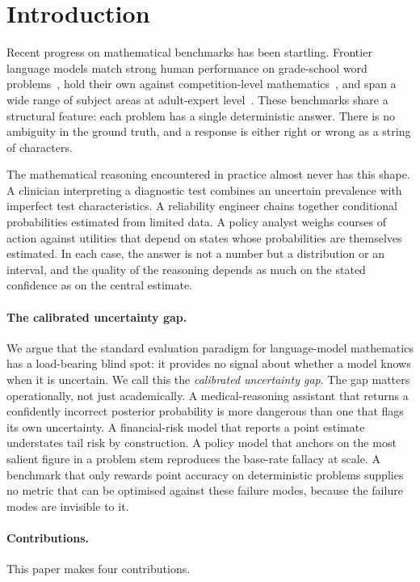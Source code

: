 \documentclass{article}
\begin{document}
\section{Introduction}
\label{sec:introduction}

Recent progress on mathematical benchmarks has been startling. Frontier language models match strong human performance on grade-school word problems~\citep{gsm8k}, hold their own against competition-level mathematics~\citep{math}, and span a wide range of subject areas at adult-expert level~\citep{mmlu}. These benchmarks share a structural feature: each problem has a single deterministic answer. There is no ambiguity in the ground truth, and a response is either right or wrong as a string of characters.

The mathematical reasoning encountered in practice almost never has this shape. A clinician interpreting a diagnostic test combines an uncertain prevalence with imperfect test characteristics. A reliability engineer chains together conditional probabilities estimated from limited data. A policy analyst weighs courses of action against utilities that depend on states whose probabilities are themselves estimated. In each case, the answer is not a number but a distribution or an interval, and the quality of the reasoning depends as much on the stated confidence as on the central estimate.

\paragraph{The calibrated uncertainty gap.}
We argue that the standard evaluation paradigm for language-model mathematics has a load-bearing blind spot: it provides no signal about whether a model knows when it is uncertain. We call this the \emph{calibrated uncertainty gap}. The gap matters operationally, not just academically. A medical-reasoning assistant that returns a confidently incorrect posterior probability is more dangerous than one that flags its own uncertainty. A financial-risk model that reports a point estimate understates tail risk by construction. A policy model that anchors on the most salient figure in a problem stem reproduces the base-rate fallacy at scale. A benchmark that only rewards point accuracy on deterministic problems supplies no metric that can be optimised against these failure modes, because the failure modes are invisible to it.

\paragraph{Contributions.}
This paper makes four contributions.
\end{document}
